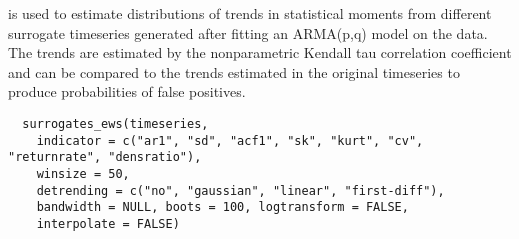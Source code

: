 \documentclass[a4paper]{book}
\begin{document}
%
\begin{Description}\relax
{} is used to estimate distributions
of trends in statistical moments from different surrogate
timeseries generated after fitting an ARMA(p,q) model on
the data. The trends are estimated by the nonparametric
Kendall tau correlation coefficient and can be compared
to the trends estimated in the original timeseries to
produce probabilities of false positives.
\end{Description}
%
\begin{Usage}
\begin{verbatim}
  surrogates_ews(timeseries,
    indicator = c("ar1", "sd", "acf1", "sk", "kurt", "cv", "returnrate", "densratio"),
    winsize = 50,
    detrending = c("no", "gaussian", "linear", "first-diff"),
    bandwidth = NULL, boots = 100, logtransform = FALSE,
    interpolate = FALSE)
\end{verbatim}
\end{Usage}
%
\end{document}
